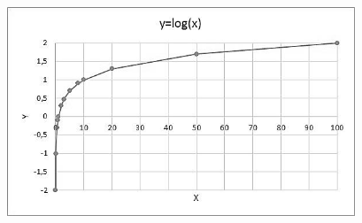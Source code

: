 \begin{figure}[H]
	\begin{Center}
		\includegraphics[width=4.3in,height=2.46in]{capitulos/logaritmos_e_funcao_logaritmica/media/image5.jpeg}
	\end{Center}
\end{figure}

